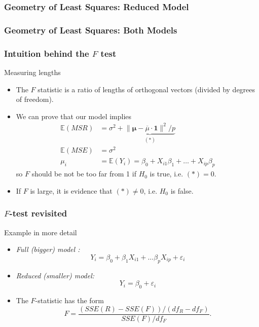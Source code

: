 \documentclass[handout]{beamer}
\newcommand{\Ee}{\mathbb{E}}
\begin{document}
   \begin{frame} \frametitle{Geometry of Least Squares: Reduced Model}

   \end{frame}


   \begin{frame} \frametitle{Geometry of Least Squares: Both Models}

   \end{frame}


   \begin{frame} \frametitle{Intuition behind the $F$ test}

   \begin{block}
   {Measuring lengths}
   \begin{itemize}
   \item The $F$ statistic is a ratio of lengths of orthogonal vectors (divided by degrees of freedom).

   \item We can prove that our model implies
   $$
   \begin{aligned}
   \Ee \left(MSR\right) &= \sigma^2 + \underbrace{\|\pmb{\mu} - \overline{\mu} \cdot \pmb{1}\|^2 / p}_{(*)} \\
   \Ee \left(MSE\right) &= \sigma^2 \\
   \mu_i &= \Ee(Y_i) = \beta_0 + X_{i1} \beta_1  + \dots +  X_{ip} \beta_p
   \end{aligned}
   $$
   so $F$ should be not be too far from 1 if $H_0$ is true, i.e. $(*)=0$.


   \item If $F$ is large, it is evidence that $(*) \neq 0$, i.e. $H_0$ is false.
   \end{itemize}
   \end{block}
   \end{frame}


   \begin{frame} \frametitle{$F$-test revisited}

   \begin{block}
   {Example in more detail}
   \begin{itemize}
   \item {\em Full (bigger) model :}
   $$
   Y_i = \beta_0 + \beta_1 X_{i1} + \dots \beta_p X_{ip} + \varepsilon_i$$
   \item {\em Reduced (smaller) model:}
   $$
   Y_i = \beta_0  + \varepsilon_i$$

   \item The $F$-statistic has the form
   $$
   F=\frac{(SSE(R) - SSE(F)) / (df_R - df_F)}{SSE(F) / df_F}.$$

   \end{itemize}
   \end{block}
   \end{frame}
\end{document}
